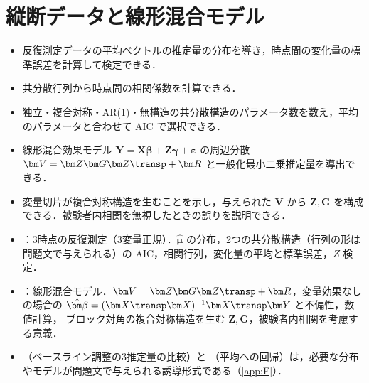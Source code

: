 \chapter{縦断データと線形混合モデル}\label{ch:08}

\begin{goalbox}
\begin{itemize}
\item 反復測定データの平均ベクトルの推定量の分布を導き，時点間の変化量の標準誤差を計算して検定できる．
\item 共分散行列から時点間の相関係数を計算できる．
\item 独立・複合対称・AR(1)・無構造の共分散構造のパラメータ数を数え，平均のパラメータと合わせて AIC で選択できる．
\item 線形混合効果モデル $\bm Y=\bm X\bm\beta+\bm Z\bm\gamma+\bm\varepsilon$ の周辺分散 $\bm V=\bm Z\bm G\bm Z\transp+\bm R$ と一般化最小二乗推定量を導出できる．
\item 変量切片が複合対称構造を生むことを示し，与えられた $\bm V$ から $\bm Z,\bm G$ を構成できる．被験者内相関を無視したときの誤りを説明できる．
\end{itemize}
\end{goalbox}

\begin{exambox}
\begin{itemize}
\item {}：3時点の反復測定（3変量正規）．$\hat{\bm\mu}$ の分布，2つの共分散構造（行列の形は問題文で与えられる）の AIC，相関行列，変化量の平均と標準誤差，$Z$ 検定．
\item {}：線形混合モデル．$\bm V=\bm Z\bm G\bm Z\transp+\bm R$，変量効果なしの場合の $\hat{\bm\beta}=(\bm X\transp\bm X)^{-1}\bm X\transp\bm Y$ と不偏性，数値計算，
      ブロック対角の複合対称構造を生む $\bm Z,\bm G$，被験者内相関を考慮する意義．
\item {}（ベースライン調整の3推定量の比較）と （平均への回帰）は，必要な分布やモデルが問題文で与えられる誘導形式である（\cref{app:F}）．
\end{itemize}
\end{exambox}


